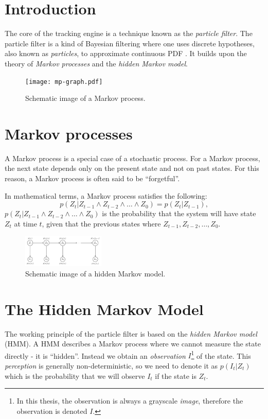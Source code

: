 \section{Introduction} The core of the tracking engine is a technique
known as the \emph{particle filter}.  The particle filter is a kind of
Bayesian filtering where one uses discrete hypotheses, also known as
\emph{particles}, to approximate continuous PDF \cite{ProbRob}.  It
builds upon the theory of \emph{Markov processes} and the \emph{hidden
Markov model}.


\begin{figure} \centering
  \texttt{[image: mp-graph.pdf]}
  \caption{Schematic image of a Markov process.}
  \label{fig:hmm-graph}
\end{figure}


\section{Markov processes} A Markov process is a special case of a
stochastic process. For a Markov process, the next state depends only
on the present state and not on past states.  For this reason, a
Markov process is often said to be ``forgetful''.

In mathematical terms, a Markov process satisfies the following:
\begin{equation} p\left(Z_t|Z_{t-1} \wedge Z_{t-2} \wedge \dots \wedge
Z_0\right) = p\left(Z_t|Z_{t-1}\right),
\end{equation} $p\left(Z_t|Z_{t-1} \wedge Z_{t-2} \wedge \dots \wedge
Z_0\right)$ is the probability that the system will have state $Z_t$
at time $t$, given that the previous states where $Z_{t-1},
Z_{t-2},\dots, Z_0$.

\begin{figure} \centering
  \includegraphics[width=0.35\textwidth]{hmm-graph.pdf}
  \caption{Schematic image of a hidden Markov model.}
  \label{fig:hmm-graph}
\end{figure}

\section{The Hidden Markov Model}

The working principle of the particle filter is based on the
\emph{hidden Markov model} (HMM).  A HMM describes a Markov process
where we cannot measure the state directly - it is
``hidden''\cite{EncyclopediaMachineLearning}.  Instead we obtain an
\emph{observation} $I$\footnote{In this thesis, the observation is
always a grayscale \emph{image}, therefore the observation is denoted
$I$.}  of the state. This \emph{perception} is generally
non-deterministic, so we need to denote it as $p(I_t|Z_t)$ which is
the probability that we will observe $I_t$ if the state is $Z_t$.


